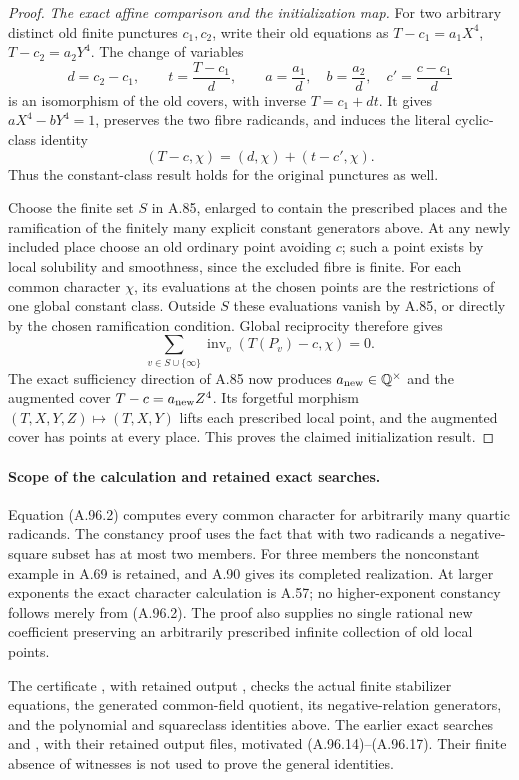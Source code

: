 \begin{proof}
\emph{The exact affine comparison and the initialization map.}
For two arbitrary distinct old finite punctures
$c_1,c_2$, write their old equations as
$T-c_1=a_1X^4$, $T-c_2=a_2Y^4$.
The change of variables
\[
 d=c_2-c_1,\qquad
 t=\frac{T-c_1}{d},\qquad
 a=\frac{a_1}{d},\quad b=\frac{a_2}{d},\quad
 c'=\frac{c-c_1}{d}
 \tag{A.96.18}
\]
is an isomorphism of the old covers, with inverse
$T=c_1+dt$.
It gives $aX^4-bY^4=1$, preserves the two fibre
radicands, and induces the literal cyclic-class identity
\[
                       (T-c,\chi)=(d,\chi)+(t-c',\chi).
 \tag{A.96.19}
\]
Thus the constant-class result holds for the original
punctures as well.

Choose the finite set $S$ in A.85, enlarged to contain
the prescribed places and the ramification of the
finitely many explicit constant generators above.
At any newly included place choose an old ordinary point
avoiding $c$; such a point exists by local solubility and
smoothness, since the excluded fibre is finite.
For each common character $\chi$, its evaluations at
the chosen points are the restrictions of one global
constant class.
Outside $S$ these evaluations vanish by A.85, or directly
by the chosen ramification condition.
Global reciprocity therefore gives
\[
       \sum_{v\in S\cup\{\infty\}}
            \operatorname{inv}_v(T(P_v)-c,\chi)=0.
 \tag{A.96.20}
\]
The exact sufficiency direction of A.85 now produces
$a_{\rm new}\in\mathbb Q^\times$ and the augmented cover
$T-c=a_{\rm new}Z^4$.
Its forgetful morphism
$(T,X,Y,Z)\mapsto(T,X,Y)$ lifts each prescribed local
point, and the augmented cover has points at every
place.
This proves the claimed initialization result.
\end{proof}

\paragraph{Scope of the calculation and retained exact searches.}
Equation (A.96.2) computes every common character for
arbitrarily many quartic radicands.
The constancy proof uses the fact that with two
radicands a negative-square subset has at most two
members.
For three members the nonconstant example in A.69 is
retained, and A.90 gives its completed realization.
At larger exponents the exact character calculation
is A.57; no higher-exponent constancy follows merely
from (A.96.2).
The proof also supplies no single rational new
coefficient preserving an arbitrarily prescribed
infinite collection of old local points.

The certificate
, with
retained output
,
checks the actual finite stabilizer equations, the generated
common-field quotient, its negative-relation generators, and
the polynomial and squareclass identities above.
The earlier exact searches
 and
, with their retained
output files, motivated (A.96.14)--(A.96.17).
Their finite absence of witnesses is not used to prove
the general identities.
